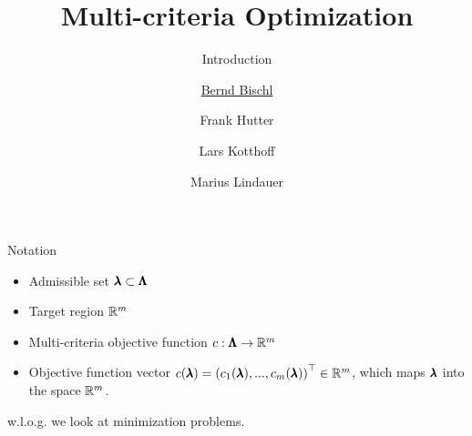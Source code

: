 

\newcommand{\xx}{\conf} %
\newcommand{\xxi}[1][i]{\lambda_{#1}} %
\newcommand{\XX}{\pcs} %
\newcommand{\f}{\cost} %
\newcommand{\yy}{\cost} %

\title[AutoML: Overview]{Multi-criteria Optimization}
\subtitle{Introduction}
\author[Bernd Bischl]{\underline{Bernd Bischl} \and Frank Hutter \and Lars Kotthoff \and Marius Lindauer}
\institute{}
\date{}






	\maketitle


\begin{frame}{Notation}

\begin{itemize}
\item Admissible set $\pmb{\lambda} \subset \pmb{\Lambda}$
\item Target region $\mathbb{R}^m$
\item Multi-criteria objective function $c: \pmb{\Lambda} \to \mathbb{R}^m$
\item Objective function vector $c(\pmb{\lambda}) = \left(c_1(\pmb{\lambda}), ..., c_m(\pmb{\lambda})\right)^\top \in \mathbb{R}^m$, which maps $\pmb{\lambda}$ into the space $\mathbb{R}^m$.
\end{itemize}

w.l.o.g. we look at minimization problems.

\end{frame}

